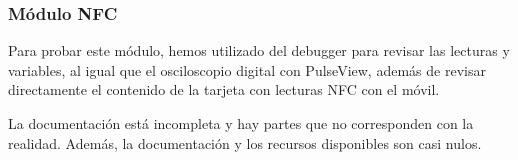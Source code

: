 \subsubsection{Módulo NFC}

Para probar este módulo, hemos utilizado del debugger para revisar las lecturas y variables, al igual que el osciloscopio digital con PulseView, además de revisar directamente el contenido de la tarjeta con lecturas NFC con el móvil.

La documentación está incompleta y hay partes que no corresponden con la realidad. Además, la documentación y los recursos disponibles son casi nulos.